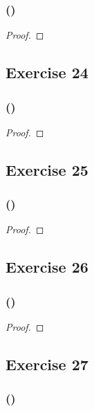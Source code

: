 \documentclass[14pt]{extarticle}
\begin{document}
\subsubsection{()}

\begin{proof}

\end{proof}

\subsection{Exercise 24}

\subsubsection{()}

\begin{proof}

\end{proof}

\subsection{Exercise 25}

\subsubsection{()}

\begin{proof}

\end{proof}

\subsection{Exercise 26}

\subsubsection{()}

\begin{proof}

\end{proof}

\subsection{Exercise 27}

\subsubsection{()}
\end{document}
